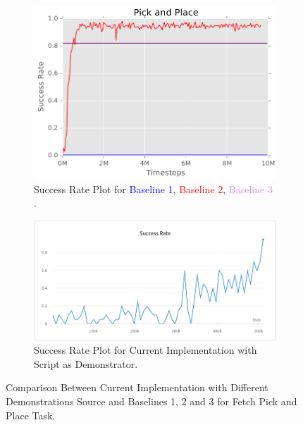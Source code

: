 \begin{figure}[h!]
     \centering
     \begin{subfigure}[b]{0.4\textwidth}
         \centering
         \includegraphics[width=\textwidth]{images/FPAPB.png}
         \caption{Success Rate Plot for \textcolor{blue}{Baseline 1}, \textcolor{red}{Baseline 2}, \textcolor{violet}{Baseline 3} \cite{nair2018overcoming}.}
     \end{subfigure}
     \begin{subfigure}[b]{0.4\textwidth}
         \centering
         \includegraphics[width=\textwidth]{images/FPAPSSR.png}
         \caption{Success Rate Plot for Current Implementation with Script as Demonstrator.}
     \end{subfigure}
        \caption{Comparison Between Current Implementation with Different Demonstrations Source and Baselines 1, 2 and 3 for Fetch Pick and Place Task.}
        \label{fig:CDB}
\end{figure}

